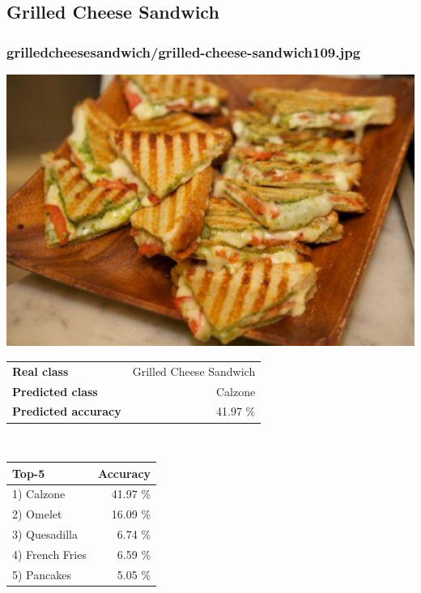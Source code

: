 \subsection{Grilled Cheese Sandwich}
    
\subsubsection{grilled\textunderscore cheese\textunderscore sandwich/grilled-cheese-sandwich109.jpg}

\begin{minipage}[t]{0.4\textwidth}
	\vspace{0pt}
	\includegraphics[width=\linewidth]{images/evaluation-images/grilled_cheese_sandwich/grilled-cheese-sandwich109.jpg}
\end{minipage}
\hfill
\begin{minipage}[t]{0.5\textwidth}
	\vspace{0pt}\raggedright
	\begin{tabularx}{\textwidth}{X r}
		\small \textbf{Real class} & \small Grilled Cheese Sandwich\\
		\small \textbf{Predicted class} & \small Calzone\\
		\small \textbf{Predicted accuracy} & \small 41.97 \%
    \end{tabularx}\\
    
    \vspace{6pt}
	\begin{tabularx}{\textwidth}{X r}
        \small \textbf{Top-5} & \small \textbf{Accuracy} \\
        \hline
		\small 1) Calzone & \small 41.97 \%\\\small 2) Omelet & \small 16.09 \%\\\small 3) Quesadilla & \small 6.74 \%\\\small 4) French Fries & \small 6.59 \%\\\small 5) Pancakes & \small 5.05 \%
    \end{tabularx}
\end{minipage}
    
